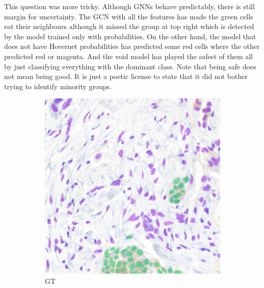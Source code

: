 This question was more tricky. Although GNNs behave predictably, there is still margin for uncertainty. The GCN with all the features has made the green cells eat their neighbours although it missed the group at top right which is detected by the model trained only with probabilities. On the other hand, the model that does not have Hovernet probabilities has predicted some red cells where the other predicted red or magenta. And the void model has played the safest of them all by just classifying everything with the dominant class. Note that being safe does not mean being good. It is just a poetic license to state that it did not bother trying to identify minority groups.

\begin{figure}[H]
  \centering
  \begin{subfigure}[b]{0.45\textwidth}
    \includegraphics[width=\textwidth]{imgs/qual/breast/gcn-full1.png}
    \caption{GT}
    \label{fig:breast-gt1}
  \end{subfigure}
  \hfill
  \begin{subfigure}[b]{0.45\textwidth}

\end{subfigure}
\end{figure}
